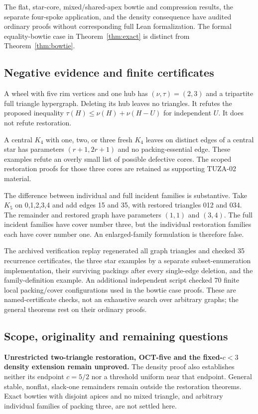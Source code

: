 \documentclass[11pt]{article}
\theoremstyle{definition}\newtheorem{definition}[theorem]{Definition}
\theoremstyle{remark}\newtheorem{remark}[theorem]{Remark}
\begin{document}
The flat, star-core, mixed/shared-apex bowtie and compression results, the separate four-spoke application, and the density consequence have audited ordinary proofs without corresponding full Lean formalization. The formal equality-bowtie case in Theorem~\ref{thm:exact} is distinct from Theorem~\ref{thm:bowtie}.
\subsection{Negative evidence and finite certificates}

A wheel with five rim vertices and one hub has \((\nu,\tau)=(2,3)\) and a tripartite full triangle hypergraph. Deleting its hub leaves no triangles. It refutes the proposed inequality \(\tau(H)\le \nu(H)+\nu(H-U)\) for independent \(U\). It does not refute restoration.

A central \(K_4\) with one, two, or three fresh \(K_4\) leaves on distinct edges of a central star has parameters \((r+1,2r+1)\) and no packing-essential edge. These examples refute an overly small list of possible defective cores. The scoped restoration proofs for those three cores are retained as supporting TUZA-02 material.

The difference between individual and full incident families is substantive. Take \(K_5\) on 0,1,2,3,4 and add edges 15 and 35, with restored triangles 012 and 034. The remainder and restored graph have parameters \((1,1)\) and \((3,4)\). The full incident families have cover number three, but the individual restoration families each have cover number one. An enlarged-family formulation is therefore false.

The archived verification replay regenerated all graph triangles and checked 35 recurrence certificates, the three star examples by a separate subset-enumeration implementation, their surviving packings after every single-edge deletion, and the family-definition example. An additional independent script checked 70 finite local packing/cover configurations used in the bowtie case proofs. These are named-certificate checks, not an exhaustive search over arbitrary graphs; the general theorems rest on their ordinary proofs.

\subsection{Scope, originality and remaining questions}
\textbf{Unrestricted two-triangle restoration, OCT-five and the fixed-$c<3$ density extension remain unproved.} The density proof also establishes neither its endpoint $c=5/2$ nor a threshold uniform near that endpoint. General stable, nonflat, slack-one remainders remain outside the restoration theorems. Exact bowties with disjoint apices and no mixed triangle, and arbitrary individual families of packing three, are not settled here.
\end{document}
